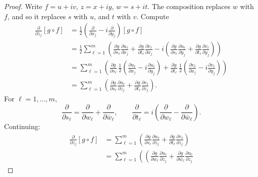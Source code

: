 \documentclass[12pt,openany]{book}
\theoremstyle{plain}
\theoremstyle{remark}
\theoremstyle{definition}
\theoremstyle{exercise}
\theoremstyle{example}
\begin{document}
\begin{proof}
Write $f = u+iv$, $z = x+iy$, $w=s+it$.
The composition replaces $w$ with $f$, and so it replaces $s$ with $u$, and
$t$ with $v$.
Compute
\begin{equation*}
\begin{split}
\frac{\partial}{\partial z_j} \left[ g \circ f \right]
& =
\frac{1}{2}
\left(
\frac{\partial}{\partial x_j} - i
\frac{\partial}{\partial y_j}
\right)
 \left[ g \circ f \right]
\\
& = 
\frac{1}{2}
\sum_{\ell=1}^m \left(
\frac{\partial g}{\partial s_\ell} \frac{\partial u_\ell}{\partial x_j}
+
\frac{\partial g}{\partial t_\ell} \frac{\partial v_\ell}{\partial x_j}
-
i
\left(
\frac{\partial g}{\partial s_\ell} \frac{\partial u_\ell}{\partial y_j}
+
\frac{\partial g}{\partial t_\ell} \frac{\partial v_\ell}{\partial y_j}
\right)
\right)
\\
& = 
\sum_{\ell=1}^m \left(
\frac{\partial g}{\partial s_\ell}
\,
\frac{1}{2}
\left(
\frac{\partial u_\ell}{\partial x_j}
-
i
\frac{\partial u_\ell}{\partial y_j}
\right)
+
\frac{\partial g}{\partial t_\ell}
\,
\frac{1}{2}
\left(
\frac{\partial v_\ell}{\partial x_j}
-
i
\frac{\partial v_\ell}{\partial y_j}
\right)
\right)
\\
& = 
\sum_{\ell=1}^m \left(
\frac{\partial g}{\partial s_\ell}
\frac{\partial u_\ell}{\partial z_j}
+
\frac{\partial g}{\partial t_\ell}
\frac{\partial v_\ell}{\partial z_j}
\right) .
\end{split}
\end{equation*}
For $\ell = 1, \ldots, m$,
\begin{equation*}
\frac{\partial}{\partial s_\ell}
=
\frac{\partial}{\partial w_\ell}
+
\frac{\partial}{\partial \bar{w}_\ell} ,
\qquad
\frac{\partial}{\partial t_\ell}
=
i \left(
\frac{\partial}{\partial w_\ell}
-
\frac{\partial}{\partial \bar{w}_\ell}
\right) .
\end{equation*}
Continuing:
\begin{equation*}
\begin{split}
\frac{\partial}{\partial z_j} \left[ g \circ f \right]
& = 
\sum_{\ell=1}^m \left(
\frac{\partial g}{\partial s_\ell}
\frac{\partial u_\ell}{\partial z_j}
+
\frac{\partial g}{\partial t_\ell}
\frac{\partial v_\ell}{\partial z_j}
\right)
\\
& = 
\sum_{\ell=1}^m \left(
\left(
\frac{\partial g}{\partial w_\ell}
\frac{\partial u_\ell}{\partial z_j}
+
\frac{\partial g}{\partial \bar{w}_\ell}
\frac{\partial u_\ell}{\partial z_j}

\end{split}
\end{equation*}
\end{proof}
\end{document}

